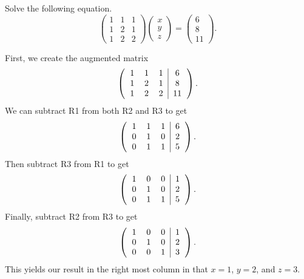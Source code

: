 \documentclass[12pt]{article} %
\begin{document}
\newpage
\begin{problem}
Solve the following equation.
\[
\begin{pmatrix} 1 & 1 & 1 \\ 1 & 2 & 1 \\ 1 & 2 & 2 \end{pmatrix} \begin{pmatrix} x \\ y \\ z \end{pmatrix} = \begin{pmatrix} 6 \\ 8 \\ 11 \end{pmatrix}.
\]
\end{problem}
\begin{solution}
First, we create the augmented matrix
\[
\left(\begin{tabular}{ccc|c} 1 & 1 & 1 & 6 \\ 1 & 2 & 1 & 8 \\ 1 & 2 & 2 & 11 \end{tabular} \right).
\]
We can subtract R1 from both R2 and R3 to get
\[
\left(\begin{tabular}{ccc|c} 1 & 1 & 1 & 6 \\ 0 & 1 & 0 & 2 \\ 0 & 1 & 1 & 5 \end{tabular} \right).
\]
Then subtract R3 from R1 to get
\[
\left(\begin{tabular}{ccc|c} 1 & 0 & 0 & 1 \\ 0 & 1 & 0 & 2 \\ 0 & 1 & 1 & 5 \end{tabular} \right).
\]
Finally, subtract R2 from R3 to get
\[
\left(\begin{tabular}{ccc|c} 1 & 0 & 0 & 1 \\ 0 & 1 & 0 & 2 \\ 0 & 0 & 1 & 3 \end{tabular} \right).
\]
This yields our result in the right most column in that $x=1$, $y=2$, and $z=3$. 
\end{solution}
\end{document}
